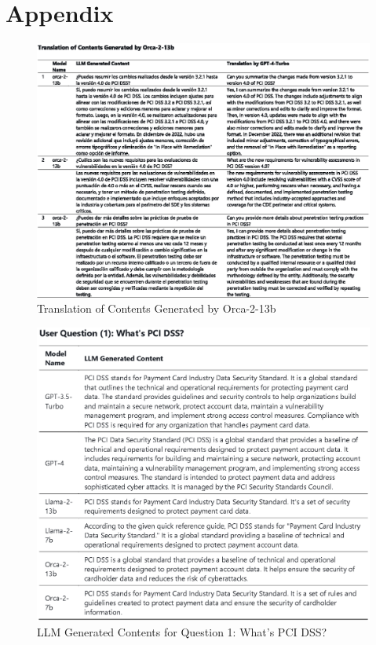 \documentclass[runningheads]{llncs}
\begin{document}
%
%
%



\appendix
\section{Appendix}

\begin{figure}
    \centering
    \includegraphics[width=0.9\linewidth]{figures/translation.eps}
    \caption{Translation of Contents Generated by Orca-2-13b}
    \label{fig:translation}
\end{figure}

\begin{figure}
    \centering
    \includegraphics[width=1.3\linewidth]{figures/question_1.eps}
    \caption{LLM Generated Contents for Question 1: What’s PCI DSS?}
    \label{fig:Question  1}
\end{figure}
\end{document}

